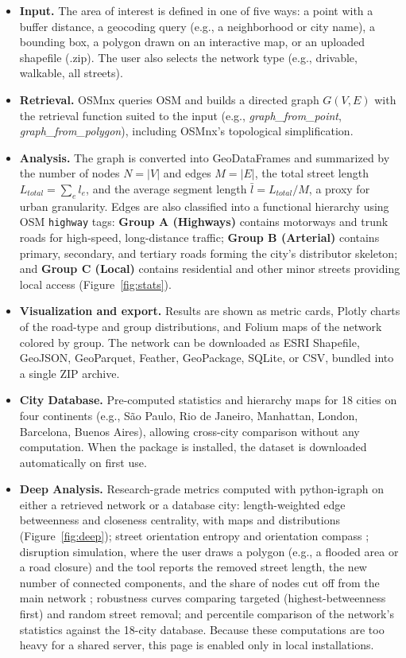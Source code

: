 \documentclass[11pt, letterpaper]{article}
\begin{document}
\begin{itemize}
    \item \textbf{Input.} The area of interest is defined in one of five ways: a point with a buffer distance, a geocoding query (e.g., a neighborhood or city name), a bounding box, a polygon drawn on an interactive map, or an uploaded shapefile (.zip). The user also selects the network type (e.g., drivable, walkable, all streets).

    \item \textbf{Retrieval.} OSMnx queries OSM and builds a directed graph $G(V,E)$ with the retrieval function suited to the input (e.g., \textit{graph\_from\_point}, \textit{graph\_from\_polygon}), including OSMnx's topological simplification.

    \item \textbf{Analysis.} The graph is converted into GeoDataFrames and summarized by the number of nodes $N=|V|$ and edges $M=|E|$, the total street length $L_{total}=\sum_e l_e$, and the average segment length $\bar{l}=L_{total}/M$, a proxy for urban granularity. Edges are also classified into a functional hierarchy using OSM \texttt{highway} tags: \textbf{Group A (Highways)} contains motorways and trunk roads for high-speed, long-distance traffic; \textbf{Group B (Arterial)} contains primary, secondary, and tertiary roads forming the city's distributor skeleton; and \textbf{Group C (Local)} contains residential and other minor streets providing local access (Figure~\ref{fig:stats}).

    \item \textbf{Visualization and export.} Results are shown as metric cards, Plotly charts of the road-type and group distributions, and Folium maps of the network colored by group. The network can be downloaded as ESRI Shapefile, GeoJSON, GeoParquet, Feather, GeoPackage, SQLite, or CSV, bundled into a single ZIP archive.

    \item \textbf{City Database.} Pre-computed statistics and hierarchy maps for 18 cities on four continents (e.g., São Paulo, Rio de Janeiro, Manhattan, London, Barcelona, Buenos Aires), allowing cross-city comparison without any computation. When the package is installed, the dataset is downloaded automatically on first use.

    \item \textbf{Deep Analysis.} Research-grade metrics computed with python-igraph \cite{csardi2006igraph} on either a retrieved network or a database city: length-weighted edge betweenness and closeness centrality, with maps and distributions (Figure~\ref{fig:deep}); street orientation entropy and orientation compass \cite{boeing2019orientation}; disruption simulation, where the user draws a polygon (e.g., a flooded area or a road closure) and the tool reports the removed street length, the new number of connected components, and the share of nodes cut off from the main network \cite{boeing_resilient_2024}; robustness curves comparing targeted (highest-betweenness first) and random street removal; and percentile comparison of the network's statistics against the 18-city database. Because these computations are too heavy for a shared server, this page is enabled only in local installations.


\end{itemize}
\end{document}
